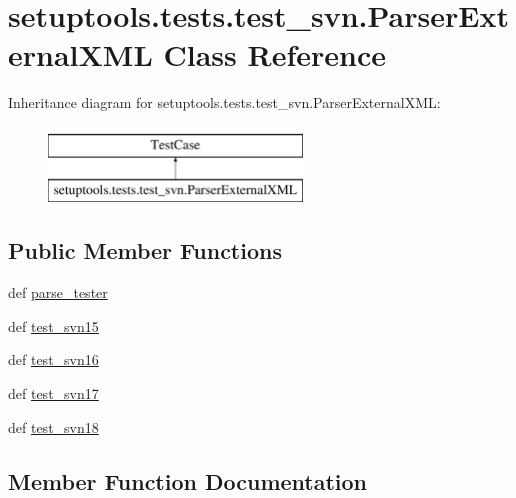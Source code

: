 \hypertarget{classsetuptools_1_1tests_1_1test__svn_1_1ParserExternalXML}{}\section{setuptools.\+tests.\+test\+\_\+svn.\+Parser\+External\+X\+M\+L Class Reference}
\label{classsetuptools_1_1tests_1_1test__svn_1_1ParserExternalXML}
Inheritance diagram for setuptools.\+tests.\+test\+\_\+svn.\+Parser\+External\+X\+M\+L\+:\begin{figure}[H]
\begin{center}
\leavevmode
\includegraphics[height=2.000000cm]{classsetuptools_1_1tests_1_1test__svn_1_1ParserExternalXML}
\end{center}
\end{figure}
\subsection*{Public Member Functions}
\begin{DoxyCompactItemize}
\item 
def \hyperlink{classsetuptools_1_1tests_1_1test__svn_1_1ParserExternalXML_ad00f78360066182b29142a8cdf5bac20}{parse\+\_\+tester}
\item 
def \hyperlink{classsetuptools_1_1tests_1_1test__svn_1_1ParserExternalXML_ac2cb1dab04a27b4b4c04a8504562a0c4}{test\+\_\+svn15}
\item 
def \hyperlink{classsetuptools_1_1tests_1_1test__svn_1_1ParserExternalXML_a4da432cafededbb51673774d39e92130}{test\+\_\+svn16}
\item 
def \hyperlink{classsetuptools_1_1tests_1_1test__svn_1_1ParserExternalXML_a19dc1ee22367108463152c72b44bb5b8}{test\+\_\+svn17}
\item 
def \hyperlink{classsetuptools_1_1tests_1_1test__svn_1_1ParserExternalXML_a997716eac2446dfb4e905e23bb3761bb}{test\+\_\+svn18}
\end{DoxyCompactItemize}


\subsection{Member Function Documentation}
\hypertarget{classsetuptools_1_1tests_1_1test__svn_1_1ParserExternalXML_ad00f78360066182b29142a8cdf5bac20}{}
